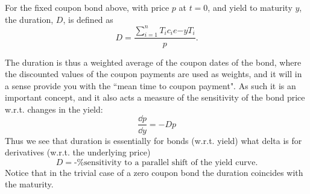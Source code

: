 \begin{definition}[Duration]
    For the fixed coupon bond above, with price $p$ at $t = 0$, and yield to maturity $y$, the duration, $D$, is defined as
    \begin{equation}
        D = \frac{\sum_{i=1}^n T_i c_i e{-yT_i}}{p}.
    \end{equation}
\end{definition}
The duration is thus a weighted average of the coupon dates of the bond, where the discounted values of the coupon payments are used as weights, and it will in a sense provide you with the ``mean time to coupon payment". As such it is an important concept, and it also acts a measure of the sensitivity of the bond price w.r.t. changes in the yield:
\begin{equation*}
    \frac{\dd p}{\dd y} = -Dp
\end{equation*}
Thus we see that duration is essentially for bonds (w.r.t. yield) what delta is for derivatives (w.r.t. the underlying price)
\begin{equation}
    D = \text{-\% sensitivity to a parallel shift of the yield curve.}
\end{equation}
Notice that in the trivial case of a zero coupon bond the duration coincides with the maturity.

